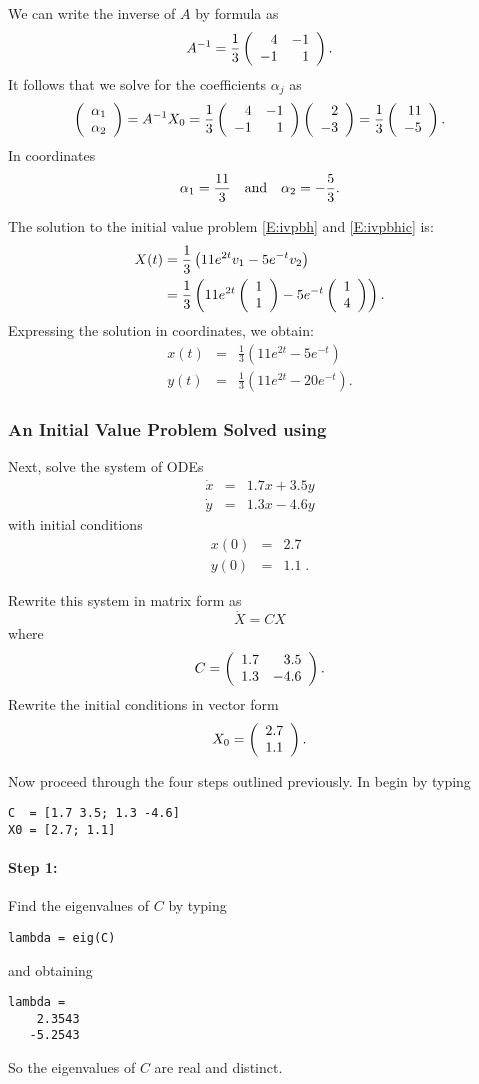 \documentclass{ximera}
\begin{document}
We can write the inverse of $A$ by formula as
\[
A^{-1} = \frac{1}{3}\left(\begin{array}{rr} 4 & -1\\ -1 &1\end{array}\right).
\]
It follows that we solve for the coefficients $\alpha_j$ as
\[
\left(\begin{array}{r} \alpha_1 \\ \alpha_2\end{array}\right) = A^{-1} X_0 =
\frac{1}{3}\left(\begin{array}{rr} 4 & -1\\ -1 &1\end{array}\right) \left(\begin{array}{r} 2 \\ -3\end{array}\right) =
\frac{1}{3} \left(\begin{array}{r} 11 \\ -5\end{array}\right).
\]
In coordinates
\[
\alpha_1 = \frac{11}{3} \quad\mbox{and}\quad \alpha_2=-\frac{5}{3}.
\]

The solution to the initial value problem \eqref{E:ivpbh} and \eqref{E:ivpbhic} is:
\begin{align*}
X(t) &=  \frac{1}{3} \left(11e^{2t}v_1 - 5e^{-t}v_2\right) \\
&= \frac{1}{3} \left(11e^{2t}\left(\begin{array}{r} 1 \\ 1\end{array}\right) - 5e^{-t}\left(\begin{array}{r} 1 \\ 4\end{array}\right) \right).
\end{align*}
Expressing the solution in coordinates, we obtain:
\begin{eqnarray*}
x(t) & = & \frac{1}{3} \left(11e^{2t} - 5e^{-t} \right)\\
y(t) & = & \frac{1}{3} \left(11e^{2t} -20e^{-t}\right).
\end{eqnarray*}



\subsubsection*{An Initial Value Problem Solved using \Matlab}

Next, solve the system of ODEs
\begin{eqnarray*}
\dot{x} & = & 1.7x+3.5y \\
\dot{y} & = & 1.3x-4.6y
\end{eqnarray*}
with initial conditions
\begin{eqnarray*}
 x(0) & = & 2.7 \\
 y(0) & = & 1.1\;.
\end{eqnarray*}

Rewrite this system in matrix form as
\[
\dot{X} = CX
\]
where
\[
C = \left(\begin{array}{rr} 1.7 & 3.5\\ 1.3 &-4.6\end{array}\right).
\]
Rewrite the initial conditions in vector form
\[
X_0 = \left(\begin{array}{r} 2.7 \\ 1.1\end{array}\right).
\]

Now proceed through the four steps outlined previously.  In \Matlab begin by
typing
\begin{verbatim}
C  = [1.7 3.5; 1.3 -4.6]
X0 = [2.7; 1.1]
\end{verbatim}

\paragraph{Step 1:}  Find the eigenvalues of $C$ by typing
\begin{verbatim}
lambda = eig(C)
\end{verbatim}
and obtaining
\begin{verbatim}
lambda =
    2.3543
   -5.2543
\end{verbatim}
So the eigenvalues of $C$ are real and distinct.
\end{document}
